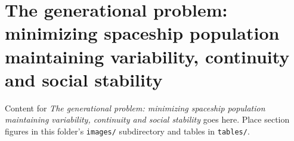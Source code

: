 \section{The generational problem: minimizing spaceship population maintaining variability, continuity and social stability}
\label{sec:the_generational_problem_minimizing_spaceship_population_maintaining_variability_continuity_and_social_stability}

Content for \emph{The generational problem: minimizing spaceship population maintaining variability, continuity and social stability} goes here. Place section figures in this
folder's \texttt{images/} subdirectory and tables in \texttt{tables/}.
